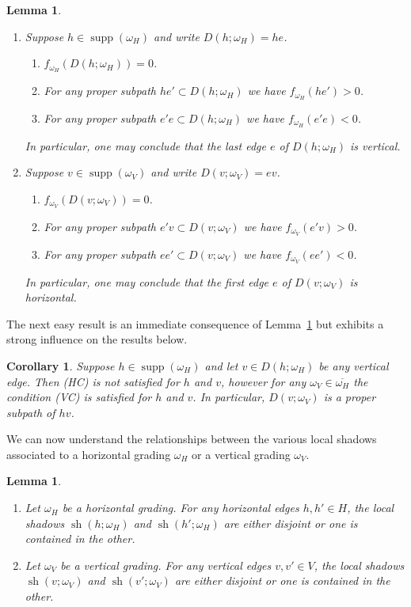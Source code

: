 \documentclass{amsart}
\newtheorem{corollary}[theorem]{Corollary}
\newtheorem{lemma}[theorem]{Lemma}
\newcommand{\supp}{\operatorname{supp}}
\newcommand{\sh}{\operatorname{sh}}
\newenvironment{enumeratea}{\begin{enumerate}[\upshape (a)]}
                           {\end{enumerate}}
\newenvironment{enumeratei}{\begin{enumerate}[\upshape (i)]}
                           {\end{enumerate}}
\begin{document}
 \begin{lemma}\label{le:sub_compatibility}\mbox{}
  \begin{enumeratea}
   \item Suppose $h\in\supp(\omega_H)$ and write $D(h;\omega_H)=he$.
   \begin{enumeratei}
    \item $f_{\omega_H}(D(h;\omega_H))=0$.
    \item For any proper subpath $he'\subset D(h;\omega_H)$ we have $f_{\omega_H}(he')>0$.
    \item For any proper subpath $e'e\subset D(h;\omega_H)$ we have $f_{\omega_H}(e'e)<0$.
   \end{enumeratei}
   In particular, one may conclude that the last edge $e$ of $D(h;\omega_H)$ is vertical.
   \item Suppose $v\in\supp(\omega_V)$ and write $D(v;\omega_V)=ev$.
   \begin{enumeratei}
    \item $f_{\omega_V}(D(v;\omega_V))=0$.
    \item For any proper subpath $e'v\subset D(v;\omega_V)$ we have $f_{\omega_V}(e'v)>0$.
    \item For any proper subpath $ee'\subset D(v;\omega_V)$ we have $f_{\omega_V}(ee')<0$.
   \end{enumeratei}
   In particular, one may conclude that the first edge $e$ of $D(v;\omega_V)$ is horizontal.
  \end{enumeratea}
 \end{lemma}
 
 The next easy result is an immediate consequence of Lemma~\ref{le:sub_compatibility} but exhibits a strong influence on the results below.
 \begin{corollary}\label{cor:remote_shadow_compatibility}
  Suppose $h\in\supp(\omega_H)$ and let $v\in D(h;\omega_H)$ be any vertical edge.  Then (HC) is not satisfied for $h$ and $v$, however for any $\omega_V\in\overline{\omega_H}$ the condition (VC) is satisfied for $h$ and $v$.  In particular, $D(v;\omega_V)$ is a proper subpath of $hv$.
 \end{corollary}

 We can now understand the relationships between the various local shadows associated to a horizontal grading $\omega_H$ or a vertical grading $\omega_V$.
 \begin{lemma}\label{le:shadow containment}\mbox{}
  \begin{enumeratea}
   \item Let $\omega_H$ be a horizontal grading.  For any horizontal edges $h,h'\in H$, the local shadows $\sh(h;\omega_H)$ and $\sh(h';\omega_H)$ are either disjoint or one is contained in the other.
   \item Let $\omega_V$ be a vertical grading.  For any vertical edges $v,v'\in V$, the local shadows $\sh(v;\omega_V)$ and $\sh(v';\omega_V)$ are either disjoint or one is contained in the other.
  \end{enumeratea}
 \end{lemma}
 
\end{document}

